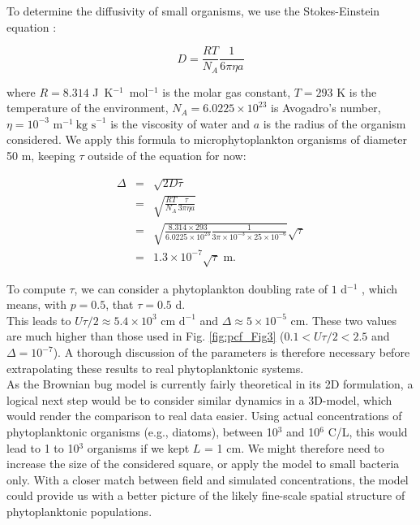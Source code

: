 To determine the diffusivity of small organisms, we use the Stokes-Einstein equation \citep{einstein1905molekularkinetischen}:

\begin{equation}
 D=\frac{RT}{N_{A}}\frac{1}{6\pi\eta a}
\end{equation}

where $R=8.314$ J~K$^{-1}$~mol$^{-1}$ is the molar gas constant, $T=293$ K is the temperature of the environment, $N_{A}=6.0225\times10^{23}$ is Avogadro's number, $\eta=10^{-3}\text{ m}^{-1}~\text{kg~s}^{-1}$ is the viscosity of water and $a$ is the radius of the organism considered. We apply this formula to microphytoplankton organisms of diameter 50 \textmu m, keeping $\tau$ outside of the equation for now:

\begin{eqnarray}
\Delta & = & \sqrt{2D\tau}\\
  &= & \sqrt{\frac{RT}{N_{A}}\frac{\tau}{3\pi\eta a}}\\
&=& \sqrt{\frac{8.314\times293}{6.0225\times10^{23}}\frac{1}{3\pi\times10^{-3}\times25\times10^{-6}}}\sqrt{\tau}\\
 & = & 1.3 \times 10^{-7} \sqrt{\tau} \text{ m.}
\end{eqnarray}

To compute $\tau$, we can consider a phytoplankton doubling rate of $1$ d$^{-1}$ \citep{bissinger_predicting_2008}, which means, with $p=0.5$, that $\tau=0.5$ d.\\

This leads to $U\tau/2\approx 5.4\times10^{3} \text{ cm~d}^{-1}$ and $\Delta \approx 5\times10^{-5}$ cm. These two values are much higher than those used in Fig. \ref{fig:pcf_Fig3} ($0.1<U\tau/2<2.5$ and $\Delta=10^{-7}$). A thorough discussion of the parameters is therefore necessary before extrapolating these results to real phytoplanktonic systems. \\

As the Brownian bug model is currently fairly theoretical in its 2D formulation, a logical next step would be to consider similar dynamics in a 3D-model, which would render the comparison to real data easier. Using actual concentrations of phytoplanktonic organisms (e.g., diatoms), between 10$^3$ and 10$^6$ C/L, this would lead to 1 to 10$^3$ organisms if we kept $L$ = 1 cm. We might therefore need to increase the size of the considered square, or apply the model to small bacteria only. With a closer match between field and simulated concentrations, the model could provide us with a better picture of the likely fine-scale spatial structure of phytoplanktonic populations. 

